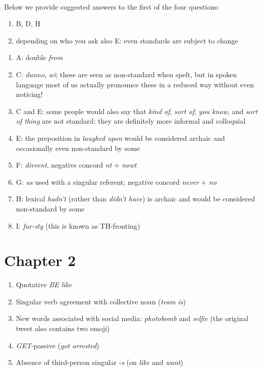 \noindent\textbf{}\

\noindent Below we provide suggested answers to the first of the four questions:

\begin{enumerate}
    \item B, D, H
    \item depending on who you ask also E: even standards are subject to change
\end{enumerate}

\begin{enumerate}
    \item A: double \textit{from}
    \item C: \textit{dunno}, \textit{wi}; these are seen as non-standard when spelt, but in spoken language most of us actually pronounce these in a reduced way without even noticing!
    \item C and E: some people would also say that \textit{kind of}, \textit{sort of}, \textit{you know}, and \textit{sort of thing} are not standard; they are definitely more informal and colloquial
    \item E: the preposition in \textit{laughed upon} would be considered archaic and occasionally even non-standard by some
    \item F: \textit{divvent}, negative concord \textit{nt} + \textit{nowt}
    \item G: \textit{us} used with a singular referent; negative concord \textit{never} + \textit{no}
    \item H: lexical \textit{hadn't} (rather than \textit{didn't have}) is archaic and would be considered non-standard by some
    \item I: \textit{fur-sty} (this is known as TH-fronting)
\end{enumerate}

\section*{Chapter 2}

\noindent\textbf{}
\begin{enumerate}
    \item Quotative \emph{BE like}
    \item Singular verb agreement with collective noun (\emph{team is})
    \item New words associated with social media: \emph{photobomb} and \emph{selfie} (the original tweet also contains two emoji)
    \item \emph{GET}-passive (\emph{got arrested})
    \item Absence of third-person singular -\emph{s} (on \emph{like} and \emph{want})
\end{enumerate}

